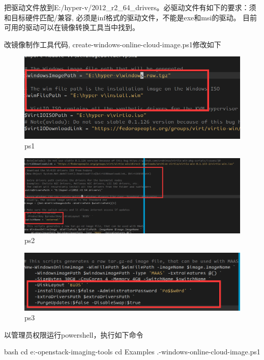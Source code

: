 把驱动文件放到E:/hyper-v/2012\_r2\_64\_drivers。必驱动文件有如下的要求：须和目标硬件匹配/兼容, 必须是inf格式的驱动文件，不能是exe和msi的驱动。
目前可用的驱动可以在镜像转换工具当中找到。

改镜像制作工具代码, create-windows-online-cloud-image.ps1修改如下
\begin{figure}[H]
  \centering
  \includegraphics[width=\linewidth]{ps1.png}
  \caption{ps1}
  \label{fig:ps1}
\end{figure}
\begin{figure}[H]
  \centering
  \includegraphics[width=\linewidth]{ps2.png}
  \caption{ps2}
  \label{fig:ps2}
\end{figure}
\begin{figure}[H]
  \centering
  \includegraphics[width=\linewidth]{ps3.png}
  \caption{ps3}
  \label{fig:ps3}
\end{figure}

以管理员权限运行powershell，执行如下命令
\begin{code-block}{bash}
cd e:\windows-openstack-imaging-tools
cd Examples
.\create-windows-online-cloud-image.ps1
\end{code-block}


